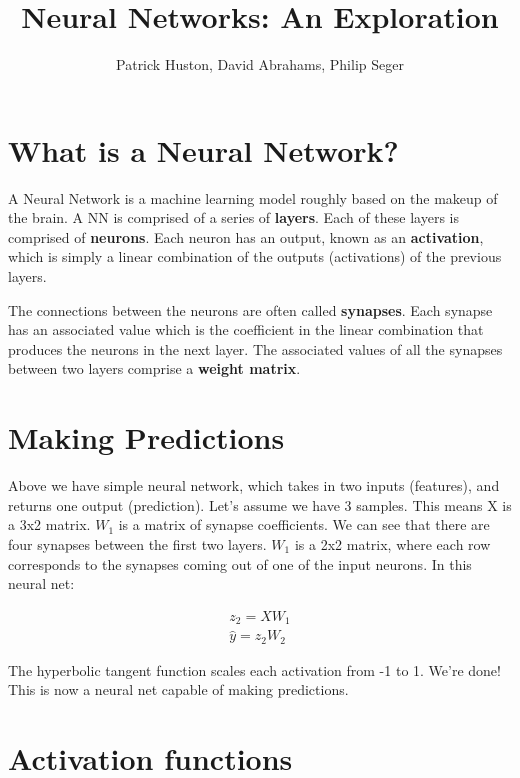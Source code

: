 \documentclass[]{article}
\title{Neural Networks: An Exploration}
\author{Patrick Huston, David Abrahams, Philip Seger}
\begin{document}
\maketitle

\begin{abstract}

\end{abstract}

\section{What is a Neural Network?}

A Neural Network is a machine learning model roughly based on the makeup of the brain. A NN is comprised of a series of \textbf{layers}. Each of these layers is comprised of \textbf{neurons}. Each neuron has an output, known as an \textbf{activation}, which is simply a linear combination of the outputs (activations) of the previous layers.

The connections between the neurons are often called \textbf{synapses}. Each synapse has an associated value which is the coefficient in the linear combination that produces the neurons in the next layer. The associated values of all the synapses between two layers comprise a \textbf{weight matrix}.

\section{Making Predictions}

Above we have simple neural network, which takes in two inputs (features), and returns one output (prediction). Let's assume we have 3 samples. This means X is a 3x2 matrix. $W_1$ is a matrix of synapse coefficients. We can see that there are four synapses between the first two layers. $W_1$ is a 2x2 matrix, where each row corresponds to the synapses coming out of one of the input neurons. In this neural net:

\begin{gather}
	z_2 = X W_1\\
	\hat{y} = z_2 W_2
\end{gather}

The hyperbolic tangent function scales each activation from -1 to 1. We're done! This is now a neural net capable of making predictions.

\section{Activation functions}
\end{document}
